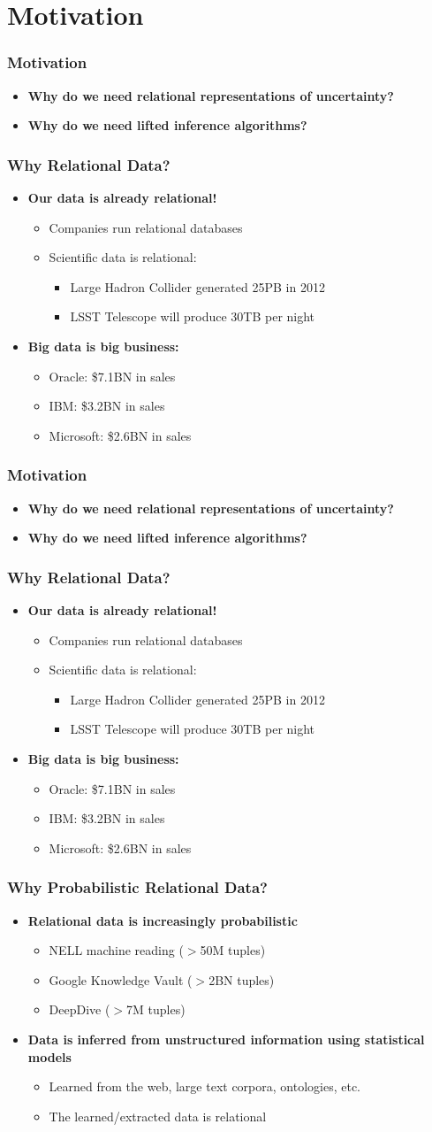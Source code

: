 \documentclass{beamer}
\newcommand{\bi}{\begin{itemize}}
\newcommand{\ei}{\end{itemize}}
\newcommand{\ii}{\item}
\begin{document}


\section{Motivation} 

\begin{frame}
\frametitle{Motivation}
\bi
\ii \textbf{Why do we need relational representations of uncertainty?}
\ei

\bi
\ii \textbf{Why do we need lifted inference algorithms?}
\ei
\end{frame}

\begin{frame}
\frametitle{Why Relational Data?}
\bi
\ii \textbf{Our data is already relational!}
\bi
\ii Companies run relational databases
\ii Scientific data is relational:
\bi
\ii Large Hadron Collider generated 25PB in 2012 
\ii LSST Telescope will produce 30TB per night
\ei
\ei
\ei

\bi
\ii \textbf{Big data is big business:}
\bi
\ii Oracle: \$7.1BN in sales
\ii IBM: \$3.2BN in sales
\ii Microsoft: \$2.6BN in sales
\ei
\ei
\end{frame}

\begin{frame}
\frametitle{Motivation}
\bi
\ii \textbf{Why do we need relational representations of uncertainty?}
\ei

\bi
\ii \textbf{Why do we need lifted inference algorithms?}
\ei
\end{frame}

\begin{frame}
\frametitle{Why Relational Data?}
\bi
\ii \textbf{Our data is already relational!}
\bi
\ii Companies run relational databases
\ii Scientific data is relational:
\bi
\ii Large Hadron Collider generated 25PB in 2012 
\ii LSST Telescope will produce 30TB per night
\ei
\ei
\ei

\bi
\ii \textbf{Big data is big business:}
\bi
\ii Oracle: \$7.1BN in sales
\ii IBM: \$3.2BN in sales
\ii Microsoft: \$2.6BN in sales
\ei
\ei
\end{frame}

\begin{frame}
\frametitle{Why Probabilistic Relational Data?}
\bi
\ii \textbf{Relational data is increasingly probabilistic}
\bi
\ii NELL machine reading ($>$50M tuples)
\ii Google Knowledge Vault ($>$2BN tuples)
\ii DeepDive ($>$7M tuples)
\ei
\ei

\bi
\ii \textbf{Data is inferred from unstructured information using statistical models}
\bi
\ii Learned from the web, large text corpora, ontologies, etc.
\ii The learned/extracted data is relational
\ei
\ei
\end{frame}
\end{document}
